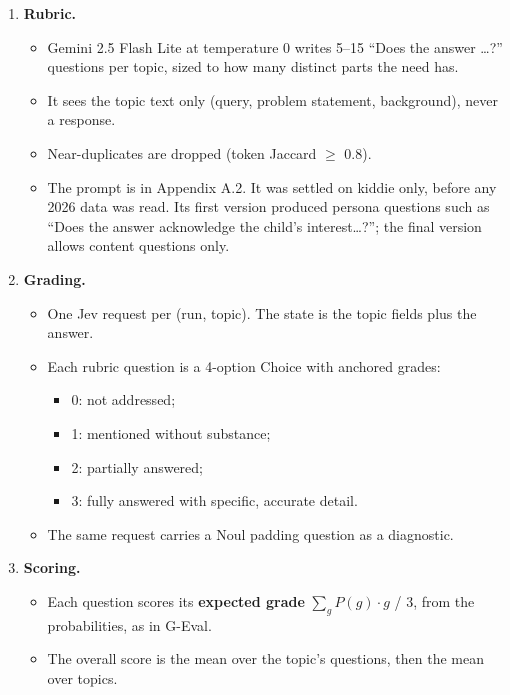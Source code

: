 \documentclass[
  10pt,
]{article}
\providecommand{\tightlist}{%
  \setlength{\itemsep}{0pt}\setlength{\parskip}{0pt}}
\begin{document}
\begin{enumerate}
\def\labelenumi{\arabic{enumi}.}
\tightlist
\item
  \textbf{Rubric.}

  \begin{itemize}
  \tightlist
  \item
    Gemini 2.5 Flash Lite at temperature 0 writes 5--15 ``Does the
    answer \ldots?'' questions per topic, sized to how many distinct
    parts the need has.
  \item
    It sees the topic text only (query, problem statement, background),
    never a response.
  \item
    Near-duplicates are dropped (token Jaccard \ensuremath{\geq} 0.8).
  \item
    The prompt is in Appendix A.2. It was settled on kiddie only, before
    any 2026 data was read. Its first version produced persona questions
    such as ``Does the answer acknowledge the child's interest\ldots?'';
    the final version allows content questions only.
  \end{itemize}
\item
  \textbf{Grading.}

  \begin{itemize}
  \tightlist
  \item
    One Jev request per (run, topic). The state is the topic fields plus
    the answer.
  \item
    Each rubric question is a 4-option Choice with anchored grades:

    \begin{itemize}
    \tightlist
    \item
      0: not addressed;
    \item
      1: mentioned without substance;
    \item
      2: partially answered;
    \item
      3: fully answered with specific, accurate detail.
    \end{itemize}
  \item
    The same request carries a Noul padding question as a diagnostic.
  \end{itemize}
\item
  \textbf{Scoring.}

  \begin{itemize}
  \tightlist
  \item
    Each question scores its \textbf{expected grade}
    \ensuremath{\sum_g P(g)\cdot g} / 3, from the probabilities, as in
    G-Eval.
  \item
    The overall score is the mean over the topic's questions, then the
    mean over topics.
  \end{itemize}
\end{enumerate}
\end{document}
